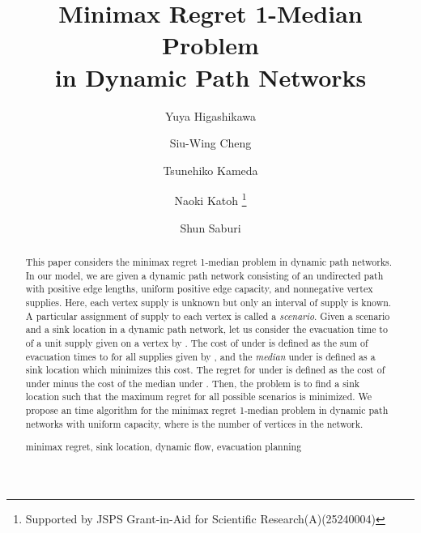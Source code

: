\documentclass[a4paper]{llncs}
\newcommand{\keywords}[1]{\par\addvspace\baselineskip
\noindent\keywordname\enspace\ignorespaces#1}
\begin{document}

\mainmatter

\title{Minimax Regret 1-Median Problem \\ in Dynamic Path Networks}

\author{
Yuya Higashikawa 
\and Siu-Wing Cheng 
\and Tsunehiko Kameda 
\and Naoki Katoh \thanks{Supported by JSPS Grant-in-Aid for Scientific Research(A)(25240004)}
\and Shun Saburi 
}



\maketitle


\begin{abstract}
This paper considers the minimax regret 1-median problem in dynamic path networks.
In our model, we are given a dynamic path network consisting of an undirected path with positive edge lengths, uniform positive edge capacity,
and nonnegative vertex supplies.
Here, each vertex supply is unknown but only an interval of supply is known.
A particular assignment of supply to each vertex is called a {\it scenario}. 
Given a scenario  and 
a sink location
 in a dynamic path network,
let us consider the evacuation time to  of a unit supply
given on a vertex by . 
The cost of  under  is defined as the sum of evacuation times to  for all supplies given by , 
and the {\it median} under  is defined as a sink location which minimizes this cost.
The regret for  under  is defined as the cost of  under  minus the cost of the median under . 
Then, the problem is to find a sink location such that the maximum regret for all possible scenarios is minimized.
We propose an  time algorithm for the minimax regret 1-median problem in dynamic path networks with uniform capacity, 
where  is the number of vertices in the network. 
\keywords{minimax regret, sink location, dynamic flow, evacuation planning}
\end{abstract}
\end{document}

